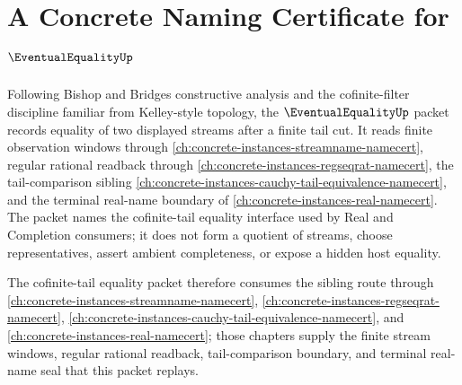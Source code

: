 \chapter{A Concrete Naming Certificate for $\EventualEqualityUp$}
\label{ch:concrete-instances-eventual-equality-namecert}

Following Bishop and Bridges constructive analysis and the cofinite-filter discipline familiar from Kelley-style topology, the $\EventualEqualityUp$ packet records equality of two displayed streams after a finite tail cut. It reads finite observation windows through \autoref{ch:concrete-instances-streamname-namecert}, regular rational readback through \autoref{ch:concrete-instances-regseqrat-namecert}, the tail-comparison sibling \autoref{ch:concrete-instances-cauchy-tail-equivalence-namecert}, and the terminal real-name boundary of \autoref{ch:concrete-instances-real-namecert}. The packet names the cofinite-tail equality interface used by Real and Completion consumers; it does not form a quotient of streams, choose representatives, assert ambient completeness, or expose a hidden host equality.

The cofinite-tail equality packet therefore consumes the sibling route through \autoref{ch:concrete-instances-streamname-namecert}, \autoref{ch:concrete-instances-regseqrat-namecert}, \autoref{ch:concrete-instances-cauchy-tail-equivalence-namecert}, and \autoref{ch:concrete-instances-real-namecert}; those chapters supply the finite stream windows, regular rational readback, tail-comparison boundary, and terminal real-name seal that this packet replays.

